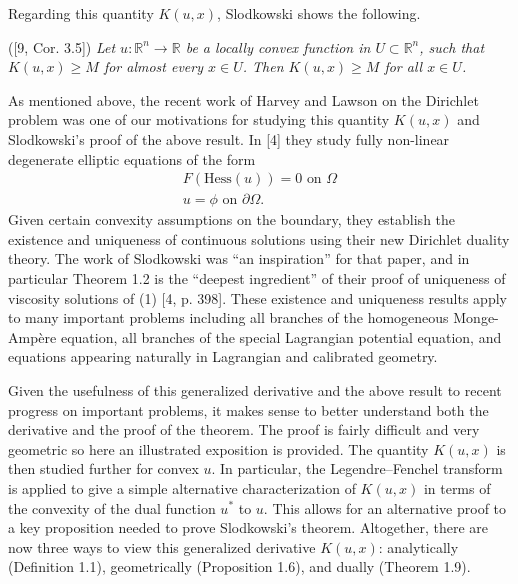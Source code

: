 \documentclass[10pt]{article}
\newenvironment{theorem}[2][Theorem]{\begin{trivlist}
\item[\hskip \labelsep {\bfseries #1}\hskip \labelsep {\bfseries #2.}]}{\end{trivlist}}
\begin{document}
Regarding this quantity $K(u,x)$, Slodkowski shows the following.
\begin{theorem}{1.2}
([9, Cor. 3.5])\textit{ Let $u:\mathbb{R}^n \rightarrow \mathbb{R}$ be a locally convex function in $U\subset \mathbb{R}^n$, such that $K(u,x)\geq M$ for almost every $x\in U$. Then $K(u,x)\geq M$ for all $x\in U$.}
\end{theorem}

As mentioned above, the recent work of Harvey and Lawson on the Dirichlet problem was one of our motivations for studying this quantity $K(u,x)$ and Slodkowski's proof of the above result. In [4] they study fully non-linear degenerate elliptic equations of the form 
\begin{align}
F(\text{Hess}(u))=0 \text{ on } \Omega\\
u=\phi \text{ on } \partial \Omega.
\end{align}
Given certain convexity assumptions on the boundary, they establish the existence and uniqueness of continuous solutions using their new Dirichlet duality theory. The work of Slodkowski was \textquotedblleft an inspiration\textquotedblright \hspace{.1mm} for that paper, and in particular Theorem 1.2 is the \textquotedblleft deepest ingredient\textquotedblright \hspace{.25mm} of their proof of uniqueness of viscosity solutions of (1) [4, p. 398]. These existence and uniqueness results apply to many important problems including all branches of the homogeneous Monge-Amp\`{e}re equation, all branches of the special Lagrangian potential equation, and equations appearing naturally in Lagrangian and calibrated geometry.

Given the usefulness of this generalized derivative and the above result to recent progress on important problems, it makes sense to better understand both the derivative and the proof of the theorem. The proof is fairly difficult and very geometric so here an illustrated exposition is provided. The quantity $K(u,x)$ is then studied further for convex $u$. In particular, the Legendre--Fenchel transform is applied to give a simple alternative characterization of $K(u,x)$ in terms of the convexity of the dual function $u^*$ to $u$. This allows for an alternative proof to a key proposition needed to prove Slodkowski's theorem. Altogether, there are now three ways to view this generalized derivative $K(u,x)$: analytically (Definition 1.1), geometrically (Proposition 1.6), and dually (Theorem 1.9).
\end{document}
